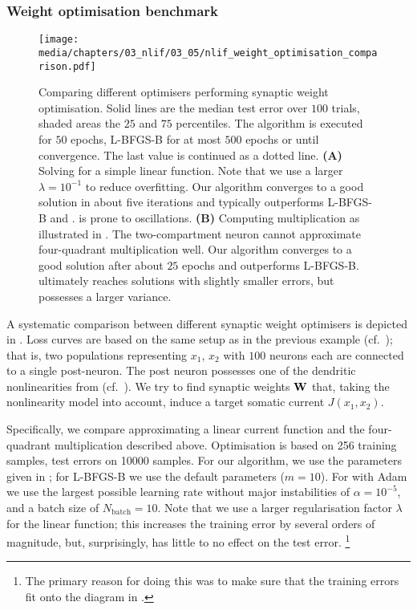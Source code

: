 \pagebreak

\subsubsection{Weight optimisation benchmark}

\begin{figure}
	\centering
	\texttt{[image: media/chapters/03\_nlif/03\_05/nlif\_weight\_optimisation\_comparison.pdf]}%
	{\label{fig:nlif_weight_optimisation_comparison_a}}%
	{\label{fig:nlif_weight_optimisation_comparison_b}}%
	\caption[Comparing different optimisers performing synaptic weight optimisation]{Comparing different optimisers performing synaptic weight optimisation.
	Solid lines are the median test error over $100$ trials, shaded areas the $25$ and $75$ percentiles.
	The \SQP algorithm is executed for $50$ epochs, L-BFGS-B for at most $500$ epochs or until convergence.
	The last value is continued as a dotted line.
	\textbf{(A)} Solving for a simple linear function. Note that we use a larger $\lambda = 10^{-1}$ to reduce overfitting. Our \SQP algorithm converges to a good solution in about five iterations and typically outperforms L-BFGS-B and \SGD. \SGD is prone to oscillations.
	\textbf{(B)} Computing multiplication as illustrated in .
	The two-compartment neuron cannot approximate four-quadrant multiplication well.
	Our \SQP algorithm converges to a good solution after about $25$ epochs and outperforms L-BFGS-B.
	\SGD ultimately reaches solutions with slightly smaller errors, but possesses a larger variance.
	}
	\label{fig:nlif_weight_optimisation_comparison}
\end{figure}

A systematic comparison between different synaptic weight optimisers is depicted in .
Loss curves are based on the same setup as in the previous example (cf.~); that is, two populations representing $x_1$, $x_2$ with $100$ neurons each are connected to a single post-neuron.
The post neuron possesses one of the dendritic nonlinearities from  (cf.~).
We try to find synaptic weights $\mathbf{W}$ that, taking the nonlinearity model into account, induce a target somatic current $J(x_1, x_2)$.

Specifically, we compare approximating a linear current function and the four-quadrant multiplication described above.
Optimisation is based on \num{256} training samples, test errors on \num{10000} samples.
For our algorithm, we use the parameters given in ; for L-BFGS-B we use the default parameters ($m = 10$).
For \SGD with Adam we use the largest possible learning rate without major instabilities of $\alpha = 10^{-5}$, and a batch size of $N_\mathrm{batch} = 10$.
Note that we use a larger regularisation factor $\lambda$ for the linear function; this increases the training error by several orders of magnitude, but, surprisingly, has little to no effect on the test error.%
\footnote{The primary reason for doing this was to make sure that the training errors fit onto the diagram in .}

